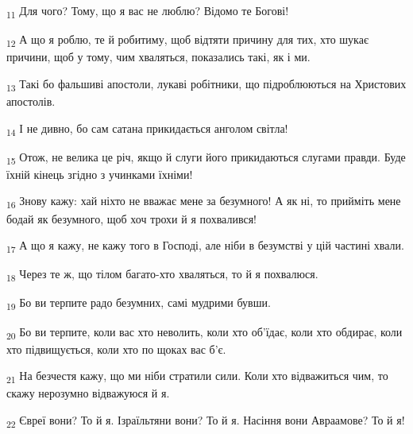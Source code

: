 \begin{tcolorbox}
\textsubscript{11} Для чого? Тому, що я вас не люблю? Відомо те Богові!
\end{tcolorbox}
\begin{tcolorbox}
\textsubscript{12} А що я роблю, те й робитиму, щоб відтяти причину для тих, хто шукає причини, щоб у тому, чим хваляться, показались такі, як і ми.
\end{tcolorbox}
\begin{tcolorbox}
\textsubscript{13} Такі бо фальшиві апостоли, лукаві робітники, що підроблюються на Христових апостолів.
\end{tcolorbox}
\begin{tcolorbox}
\textsubscript{14} І не дивно, бо сам сатана прикидається анголом світла!
\end{tcolorbox}
\begin{tcolorbox}
\textsubscript{15} Отож, не велика це річ, якщо й слуги його прикидаються слугами правди. Буде їхній кінець згідно з учинками їхніми!
\end{tcolorbox}
\begin{tcolorbox}
\textsubscript{16} Знову кажу: хай ніхто не вважає мене за безумного! А як ні, то прийміть мене бодай як безумного, щоб хоч трохи й я похвалився!
\end{tcolorbox}
\begin{tcolorbox}
\textsubscript{17} А що я кажу, не кажу того в Господі, але ніби в безумстві у цій частині хвали.
\end{tcolorbox}
\begin{tcolorbox}
\textsubscript{18} Через те ж, що тілом багато-хто хваляться, то й я похвалюся.
\end{tcolorbox}
\begin{tcolorbox}
\textsubscript{19} Бо ви терпите радо безумних, самі мудрими бувши.
\end{tcolorbox}
\begin{tcolorbox}
\textsubscript{20} Бо ви терпите, коли вас хто неволить, коли хто об'їдає, коли хто обдирає, коли хто підвищується, коли хто по щоках вас б'є.
\end{tcolorbox}
\begin{tcolorbox}
\textsubscript{21} На безчестя кажу, що ми ніби стратили сили. Коли хто відважиться чим, то скажу нерозумно відважуюся й я.
\end{tcolorbox}
\begin{tcolorbox}
\textsubscript{22} Євреї вони? То й я. Ізраїльтяни вони? То й я. Насіння вони Авраамове? То й я!
\end{tcolorbox}
